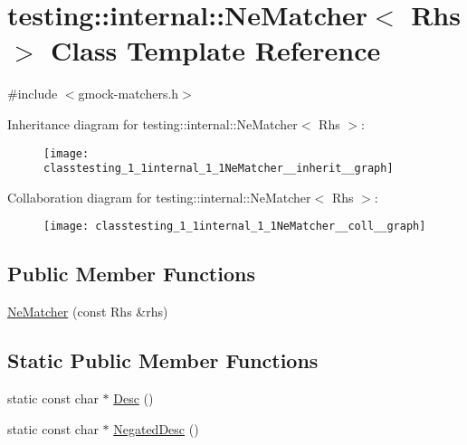 \hypertarget{classtesting_1_1internal_1_1NeMatcher}{}\section{testing\+:\+:internal\+:\+:Ne\+Matcher$<$ Rhs $>$ Class Template Reference}
\label{classtesting_1_1internal_1_1NeMatcher}


{\ttfamily \#include $<$gmock-\/matchers.\+h$>$}



Inheritance diagram for testing\+:\+:internal\+:\+:Ne\+Matcher$<$ Rhs $>$\+:
\nopagebreak
\begin{figure}[H]
\begin{center}
\leavevmode
\texttt{[image: classtesting\_1\_1internal\_1\_1NeMatcher\_\_inherit\_\_graph]}
\end{center}
\end{figure}


Collaboration diagram for testing\+:\+:internal\+:\+:Ne\+Matcher$<$ Rhs $>$\+:
\nopagebreak
\begin{figure}[H]
\begin{center}
\leavevmode
\texttt{[image: classtesting\_1\_1internal\_1\_1NeMatcher\_\_coll\_\_graph]}
\end{center}
\end{figure}
\subsection*{Public Member Functions}
\begin{DoxyCompactItemize}
\item 
\hyperlink{classtesting_1_1internal_1_1NeMatcher_a64842882811cc96624c87119c51edd3e}{Ne\+Matcher} (const Rhs \&rhs)
\end{DoxyCompactItemize}
\subsection*{Static Public Member Functions}
\begin{DoxyCompactItemize}
\item 
static const char $\ast$ \hyperlink{classtesting_1_1internal_1_1NeMatcher_a2ec33febe5471f9d435b4dc9f5cda564}{Desc} ()
\item 
static const char $\ast$ \hyperlink{classtesting_1_1internal_1_1NeMatcher_a9ea152391b69d422ba2a88c3d2d2dae5}{Negated\+Desc} ()
\end{DoxyCompactItemize}


